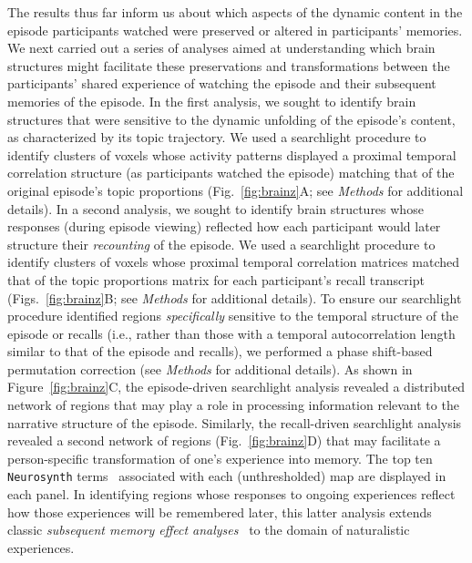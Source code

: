 \documentclass[10pt]{article}
\begin{document}
The results thus far inform us about which aspects of the dynamic content in the episode participants watched were preserved or altered in participants' memories.  We next carried out a series of analyses aimed at understanding which brain structures might facilitate these preservations and transformations between the participants' shared experience of watching the episode and their subsequent memories of the episode.  In the first analysis, we sought to identify brain structures that were sensitive to the dynamic unfolding of the episode's content, as characterized by its topic trajectory.  We used a searchlight procedure to identify clusters of voxels whose activity patterns displayed a proximal temporal correlation structure (as participants watched the episode) matching that of the original episode's topic proportions (Fig.~\ref{fig:brainz}A; see \textit{Methods} for additional details).  In a second analysis, we sought to identify brain structures whose responses (during episode viewing) reflected how each participant would later structure their \textit{recounting} of the episode.  We used a searchlight procedure to identify clusters of voxels whose proximal temporal correlation matrices matched that of the topic proportions matrix for each participant's recall transcript (Figs.~\ref{fig:brainz}B; see \textit{Methods} for additional details).  To ensure our searchlight procedure identified regions \textit{specifically} sensitive to the temporal structure of the episode or recalls (i.e., rather than those with a temporal autocorrelation length similar to that of the episode and recalls), we performed a phase shift-based permutation correction (see \textit{Methods} for additional details). As shown in Figure~\ref{fig:brainz}C, the episode-driven searchlight analysis revealed a distributed network of regions that may play a role in processing information relevant to the narrative structure of the episode.  Similarly, the recall-driven searchlight analysis revealed a second network of regions (Fig.~\ref{fig:brainz}D) that may facilitate a person-specific transformation of one's experience into memory.  The top ten \texttt{Neurosynth} terms~\citep{YarkEtal11} associated with each (unthresholded) map are displayed in each panel.  In identifying regions whose responses to ongoing experiences reflect how those experiences will be remembered later, this latter analysis extends classic \textit{subsequent memory effect analyses}~\citep[e.g.,][]{PallWagn02} to the domain of naturalistic experiences.
\end{document}
